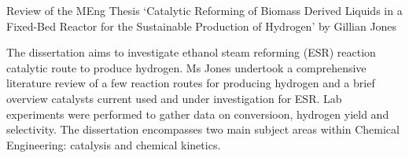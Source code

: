 \documentclass[14pt,twoside]{report}
\begin{document}
\clearpage



\bigskip

\begin{center}
  {\Large Review of the MEng Thesis `Catalytic Reforming of Biomass Derived Liquids in a Fixed-Bed Reactor for the Sustainable Production of Hydrogen' by Gillian Jones}
\end{center}
The dissertation aims to investigate ethanol steam reforming (ESR) reaction catalytic route to produce hydrogen. Ms Jones undertook a comprehensive literature review of a few reaction routes for producing hydrogen and a brief overview catalysts current used and under investigation for ESR. Lab experiments were performed to gather data on conversioon, hydrogen yield and selectivity.  The dissertation encompasses two main subject areas within Chemical Engineering: catalysis and chemical kinetics. 
\end{document}
